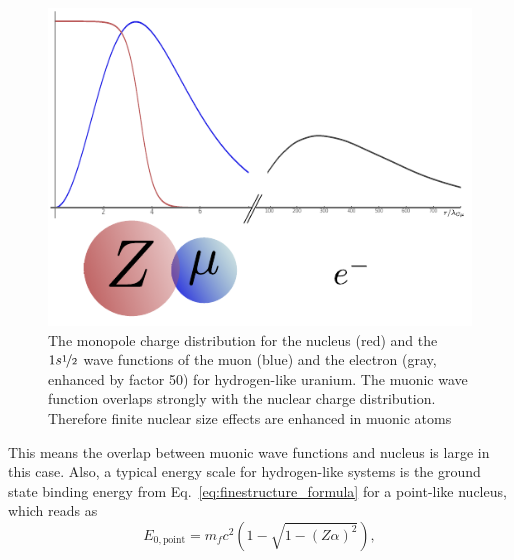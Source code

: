 %
\begin{figure}%
\centering
\includegraphics[width=0.75\linewidth]{pics/muon_groundState.pdf}%
\caption{The monopole charge distribution for the nucleus (red) and the $1s\nicefrac{1}{2}$ wave functions of the muon (blue) and the electron (gray, enhanced by factor 50) for hydrogen-like uranium. The muonic wave function overlaps strongly with the nuclear charge distribution. Therefore finite nuclear size effects are enhanced in muonic atoms}%
\label{fig:muonGS}%
\end{figure}
%
This means the overlap between muonic wave functions and nucleus is large in this case. Also, a typical energy scale for hydrogen-like systems is the ground state binding energy from Eq.~\eqref{eq:finestructure_formula} for a point-like nucleus, which reads as
\begin{equation}
E_{0,\text{point}}=m_f c^2 (1-\sqrt{1-(Z\alpha)^2}),
\end{equation}
